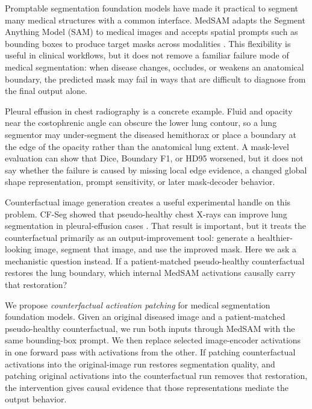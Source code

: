 \documentclass[runningheads]{llncs}
\begin{document}
Promptable segmentation foundation models have made it practical to segment many medical structures with a common interface. MedSAM adapts the Segment Anything Model (SAM) to medical images and accepts spatial prompts such as bounding boxes to produce target masks across modalities \cite{kirillov2023segment,ma2024medsam}. This flexibility is useful in clinical workflows, but it does not remove a familiar failure mode of medical segmentation: when disease changes, occludes, or weakens an anatomical boundary, the predicted mask may fail in ways that are difficult to diagnose from the final output alone.

Pleural effusion in chest radiography is a concrete example. Fluid and opacity near the costophrenic angle can obscure the lower lung contour, so a lung segmentor may under-segment the diseased hemithorax or place a boundary at the edge of the opacity rather than the anatomical lung extent. A mask-level evaluation can show that Dice, Boundary F1, or HD95 worsened, but it does not say whether the failure is caused by missing local edge evidence, a changed global shape representation, prompt sensitivity, or later mask-decoder behavior.

Counterfactual image generation creates a useful experimental handle on this problem. CF-Seg showed that pseudo-healthy chest X-rays can improve lung segmentation in pleural-effusion cases \cite{mehta2025cfseg}. That result is important, but it treats the counterfactual primarily as an output-improvement tool: generate a healthier-looking image, segment that image, and use the improved mask. Here we ask a mechanistic question instead. If a patient-matched pseudo-healthy counterfactual restores the lung boundary, which internal MedSAM activations causally carry that restoration?

We propose \emph{counterfactual activation patching} for medical segmentation foundation models. Given an original diseased image and a patient-matched pseudo-healthy counterfactual, we run both inputs through MedSAM with the same bounding-box prompt. We then replace selected image-encoder activations in one forward pass with activations from the other. If patching counterfactual activations into the original-image run restores segmentation quality, and patching original activations into the counterfactual run removes that restoration, the intervention gives causal evidence that those representations mediate the output behavior.
\end{document}
